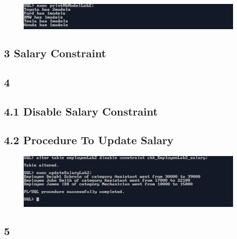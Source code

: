 

\vspace{0.25cm}
\begin{figure}[ht]
    \centering
    \includegraphics[width=\textwidth]{SQL/examples/PLSQL/EX1/PNG/ex2.png}
\end{figure}

\vspace{0.5cm}
\subsection*{3 Salary Constraint}



\newpage
\subsection*{4}

\subsection*{4.1 Disable Salary Constraint}



\subsection*{4.2 Procedure To Update Salary}



\newpage
\begin{figure}[ht]
    \centering
    \includegraphics[width=\textwidth]{SQL/examples/PLSQL/EX1/PNG/ex4.png}
\end{figure}

\vspace{0.5cm}

\subsection*{5}

